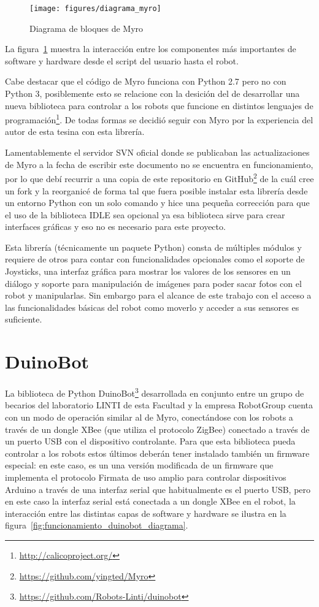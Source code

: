 \begin{figure}
    \centering
    \texttt{[image: figures/diagrama\_myro]}
    \caption{Diagrama de bloques de Myro}
    \label{fig:diagrama_myro}
\end{figure}

La figura~\ref{fig:diagrama_myro} muestra la interacción entre los componentes
más importantes de software y hardware desde el script del usuario hasta el
robot.

Cabe destacar que el código de Myro funciona con Python 2.7 pero no con
Python 3, posiblemente esto se relacione con la desición del \ipre{}
de desarrollar una nueva biblioteca para controlar a los robots que funcione
en distintos lenguajes de
programación\footnote{\url{http://calicoproject.org/}}. De todas formas se
decidió seguir con Myro por la experiencia del autor de esta tesina
con esta librería.

Lamentablemente el servidor SVN oficial donde se publicaban las
actualizaciones de Myro a la fecha de escribir este documento
no se encuentra en funcionamiento, por lo que debí recurrir a una
copia de este repositorio en
GitHub\footnote{\url{https://github.com/yingted/Myro}} de la cuál
cree un fork y la reorganicé de forma tal que fuera posible instalar
esta librería desde un entorno Python con un solo comando y hice
una pequeña corrección para que el uso de la biblioteca IDLE sea
opcional ya esa biblioteca sirve para crear interfaces gráficas
y eso no es necesario para este proyecto.

Esta librería (técnicamente un paquete Python) consta de múltiples
módulos y requiere de otros para contar con funcionalidades opcionales
como el soporte de Joysticks, una interfaz gráfica para mostrar
los valores de los sensores en un diálogo y soporte para manipulación
de imágenes para poder sacar fotos con el robot y manipularlas. Sin
embargo para el alcance de este trabajo con el acceso a las funcionalidades
básicas del robot como moverlo y acceder a sus sensores es suficiente.


\section{DuinoBot}\label{sec:duinobot}

La biblioteca de Python
DuinoBot\footnote{\url{https://github.com/Robots-Linti/duinobot}}
desarrollada en conjunto entre un grupo
de becarios del laboratorio LINTI de esta Facultad y la empresa RobotGroup
cuenta con un modo de operación similar al de Myro, conectándose con
los robots a través de un dongle XBee (que utiliza el protocolo ZigBee)
conectado a través de un puerto USB con el dispositivo controlante.
Para que esta biblioteca pueda controlar a los robots estos últimos
deberán tener instalado también un firmware especial: en este caso,
es un una versión modificada de un firmware que implementa el protocolo
Firmata de uso amplio para controlar dispositivos Arduino a través de una
interfaz serial que habitualmente es el puerto USB, pero en este caso
la interfaz serial está conectada a un dongle XBee en el robot, la interacción
entre las distintas capas de software y hardware se ilustra en la
figura~\ref{fig:funcionamiento_duinobot_diagrama}.

